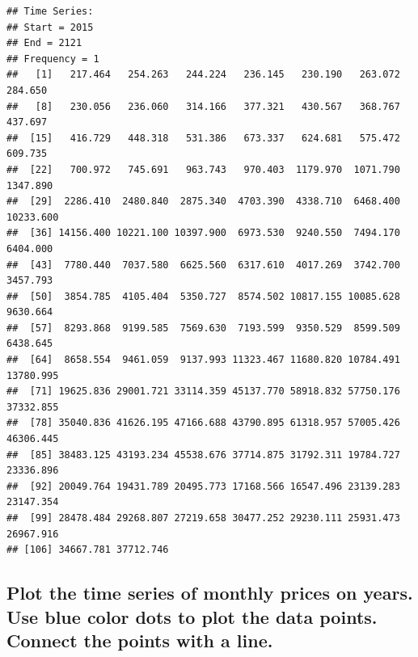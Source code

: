 \documentclass[
]{book}
\newenvironment{Shaded}{\begin{snugshade}}{\end{snugshade}}
\newcommand{\AttributeTok}[1]{\textcolor[rgb]{0.13,0.29,0.53}{#1}}
\newcommand{\CommentTok}[1]{\textcolor[rgb]{0.56,0.35,0.01}{\textit{#1}}}
\newcommand{\DecValTok}[1]{\textcolor[rgb]{0.00,0.00,0.81}{#1}}
\newcommand{\FunctionTok}[1]{\textcolor[rgb]{0.13,0.29,0.53}{\textbf{#1}}}
\newcommand{\NormalTok}[1]{#1}
\newcommand{\OtherTok}[1]{\textcolor[rgb]{0.56,0.35,0.01}{#1}}
\newcommand{\SpecialCharTok}[1]{\textcolor[rgb]{0.81,0.36,0.00}{\textbf{#1}}}
\newcommand{\StringTok}[1]{\textcolor[rgb]{0.31,0.60,0.02}{#1}}
\begin{document}
\begin{Shaded}
\end{Shaded}

\begin{verbatim}
## Time Series:
## Start = 2015 
## End = 2121 
## Frequency = 1 
##   [1]   217.464   254.263   244.224   236.145   230.190   263.072   284.650
##   [8]   230.056   236.060   314.166   377.321   430.567   368.767   437.697
##  [15]   416.729   448.318   531.386   673.337   624.681   575.472   609.735
##  [22]   700.972   745.691   963.743   970.403  1179.970  1071.790  1347.890
##  [29]  2286.410  2480.840  2875.340  4703.390  4338.710  6468.400 10233.600
##  [36] 14156.400 10221.100 10397.900  6973.530  9240.550  7494.170  6404.000
##  [43]  7780.440  7037.580  6625.560  6317.610  4017.269  3742.700  3457.793
##  [50]  3854.785  4105.404  5350.727  8574.502 10817.155 10085.628  9630.664
##  [57]  8293.868  9199.585  7569.630  7193.599  9350.529  8599.509  6438.645
##  [64]  8658.554  9461.059  9137.993 11323.467 11680.820 10784.491 13780.995
##  [71] 19625.836 29001.721 33114.359 45137.770 58918.832 57750.176 37332.855
##  [78] 35040.836 41626.195 47166.688 43790.895 61318.957 57005.426 46306.445
##  [85] 38483.125 43193.234 45538.676 37714.875 31792.311 19784.727 23336.896
##  [92] 20049.764 19431.789 20495.773 17168.566 16547.496 23139.283 23147.354
##  [99] 28478.484 29268.807 27219.658 30477.252 29230.111 25931.473 26967.916
## [106] 34667.781 37712.746
\end{verbatim}

\subsection*{Plot the time series of monthly prices on years. Use blue color dots to plot the data points. Connect the points with a line.}\label{plot-the-time-series-of-monthly-prices-on-years.-use-blue-color-dots-to-plot-the-data-points.-connect-the-points-with-a-line.}
\end{document}
